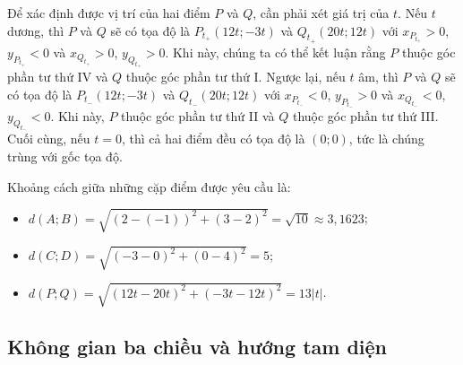 \documentclass[a4paper, titlepage, openany]{book}
\begin{document}
Để xác định được vị trí của hai điểm $P$ và $Q$, cần phải xét giá trị của $t$. Nếu $t$ dương, thì $P$ và $Q$ sẽ có tọa độ là $P_{t_+}(12t;-3t)$ và $Q_{t_+}(20t;12t)$ với $x_{P_{t_+}}>0$, $y_{P_{t_+}}<0$ và $x_{Q_{t_+}}>0$, $y_{Q_{t_+}}>0$. Khi này, chúng ta có thể kết luận rằng $P$ thuộc góc phần tư thứ IV và $Q$ thuộc góc phần tư thứ I. Ngược lại, nếu $t$ âm, thì $P$ và $Q$ sẽ có tọa độ là $P_{t_-}(12t;-3t)$ và $Q_{t_-}(20t;12t)$ với $x_{P_{t_-}}<0$, $y_{P_{t_-}}>0$ và $x_{Q_{t_-}}<0$, $y_{Q_{t_-}}<0$. Khi này, $P$ thuộc góc phần tư thứ II và $Q$ thuộc góc phần tư thứ III. Cuối cùng, nếu $t=0$, thì cả hai điểm đều có tọa độ là $(0;0)$, tức là chúng trùng với gốc tọa độ.

Khoảng cách giữa những cặp điểm được yêu cầu là:
\begin{itemize}
   \item $d(A;B) = \sqrt{\left(2-(-1)\right)^2+\left(3-2\right)^2} = \sqrt{10} \approx 3{,}1623$;
   \item $d(C;D) = \sqrt{\left(-3-0\right)^2+\left(0-4\right)^2} = 5$;
   \item $d(P;Q) = \sqrt{\left(12t-20t\right)^2+\left(-3t-12t\right)^2} = 13|t|$.
\end{itemize}

\subsection{Không gian ba chiều và hướng tam diện}
\end{document}
